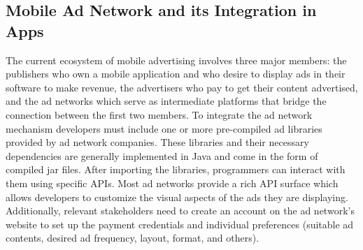 \documentclass[conference]{IEEEtran}
\begin{document}
\subsection{Mobile Ad Network and its Integration in Apps}
The current ecosystem of mobile advertising involves three major members: the publishers who own a mobile application and who desire to display ads in their software to make revenue, the advertisers who pay to get their content advertised, and the ad networks which serve as intermediate platforms that bridge the connection between the first two members. To integrate the ad network mechanism developers must include one or more pre-compiled ad libraries provided by ad network companies. These libraries and their necessary dependencies are generally implemented in Java and come in the form of compiled jar files. After importing the libraries, programmers can interact with them using specific APIs. Most ad networks provide a rich API surface which allows developers to customize the visual aspects of the ads they are displaying. Additionally, relevant stakeholders need to create an account on the ad network’s website to set up the payment credentials and individual preferences (suitable ad contents, desired ad frequency, layout, format, and others). 
\end{document}
